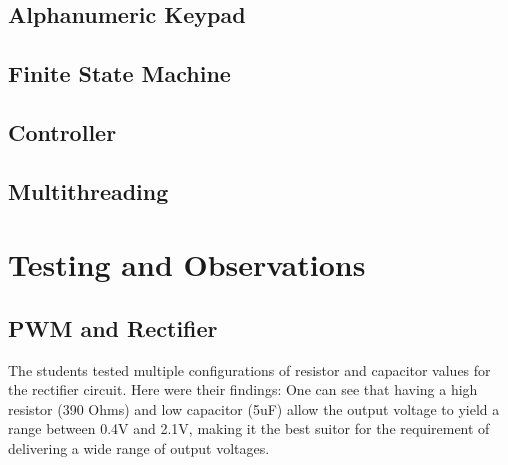 \documentclass[12pt]{report}
\begin{document}
\subsection{Alphanumeric Keypad}


\subsection{Finite State Machine}


\subsection{Controller}

\subsection{Multithreading}

\section{Testing and Observations}

\subsection{PWM and Rectifier}\label{testpwm}

The students tested multiple configurations of resistor and capacitor values for the rectifier circuit. Here were their findings:
One can see that having a high resistor (390 Ohms) and low capacitor (5uF) allow the output voltage to yield a range between 0.4V and 2.1V, making it the best suitor for the requirement of delivering a wide range of output voltages.
\end{document}
